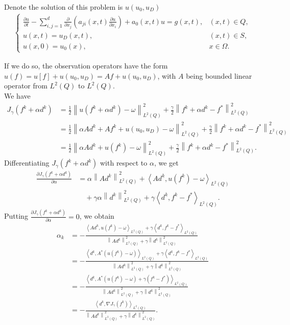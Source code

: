 \documentclass[]{article}
\begin{document}
\begin{bt}\label{bt2.2}
	Denote the solution of this problem is $u(u_0, u_D)$
	\begin{align*}
		\begin{cases}
			\frac{\partial u}{\partial t}-\sum_{i, j=1}^{d}\frac{\partial}{\partial x_j}\left(a_{ji}(x, t)\frac{\partial u}{\partial x_i}\right)+a_0(x, t)u=g(x, t),&(x, t)\in Q,\\
			u(x, t)=u_D(x, t), & (x, t)\in S,\\
			u(x, 0)=u_0(x),&x\in \Omega.
		\end{cases}
	\end{align*}
\end{bt}
\noindent If we do so, the observation operators have the form $u(f)= u[f]+ u(u_0, u_D)=Af+ u(u_0, u_D)$, with $A$ being bounded linear operator from $L^2(Q)$ to $L^2(Q)$.\\
We have
\begin{align*}
	J_{\gamma}(f^k+\alpha d^k)&=\frac{1}{2}\left\| u(f^k+\alpha d^k)-\omega\right\|_{L^2(Q)}^2+\frac{\gamma}{2}\left\|f^k+\alpha d^k-f^*\right\|_{L^2(Q)}^2\\[0.2cm]
	&=\frac{1}{2}\left\|\alpha Ad^k+Af^k+ u(u_0, u_D)-\omega\right\|_{L^2(Q)}^2+\frac{\gamma}{2}\left\|f^k+\alpha d^k-f^*\right\|_{L^2(Q)}^2\\[0.2cm]
	&=\frac{1}{2}\left\|\alpha Ad^k+ u(f^k)-\omega\right\|_{L^2(Q)}^2+\frac{\gamma}{2}\left\|f^k+\alpha d^k-f^*\right\|_{L^2(Q)}^2.
\end{align*}
Differentiating $J_\gamma(f^k+\alpha d^k)$ with respect to $\alpha$, we get
\begin{align*}
	\frac{\partial J_\gamma(f^k+\alpha d^k)}{\partial \alpha} &= \alpha\left\|Ad^k \right\|_{L^2(Q)}^2+\left\langle Ad^k, u(f^k)-\omega\right\rangle_{L^2(Q)}\\[0.2cm]
	&\quad+\gamma\alpha\left\| d^k\right\|_{L^2(Q)}^2+\gamma\left\langle d^k, f^k-f^*\right\rangle_{L^2(Q)}.
\end{align*}
Putting $\frac{\partial J_\gamma(f^k+\alpha d^k)}{\partial \alpha}=0$, we obtain
\begin{align*}
	\alpha_k&=-\frac{\displaystyle\left\langle Ad^k,  u(f^k)-\omega\right\rangle_{L^2(Q)}+\gamma\left\langle d^k, f^k-f^*\right\rangle_{L^2(Q)}}{\displaystyle\left\|Ad^k\right\|^2_{L^2(Q)}+\gamma\left\|d^k\right\|^2_{L^2(Q)}}\\[0.2cm]
	&=-\frac{\displaystyle\left\langle d^k, A^*\left( u(f^k)-\omega\right)\right\rangle_{L^2(Q)}+\gamma\left\langle d^k, f^k-f^*\right\rangle_{L^2(Q)}}{\displaystyle\left\|Ad^k\right\|^2_{L^2(Q)}+\gamma\left\|d^k\right\|^2_{L^2(Q)}}\\[0.2cm]
	&=-\frac{\displaystyle\left\langle d^k, A^*\left( u(f^k)-\omega\right)+\gamma(f^k-f^*)\right\rangle_{L^2(Q)}}{\displaystyle\left\|Ad^k\right\|^2_{L^2(Q)}+\gamma\left\|d^k\right\|^2_{L^2(Q)}}\\[0.2cm]
	&=-\frac{\left\langle d^k,\nabla J_\gamma(f^k)\right\rangle_{L^2(Q)}}{\displaystyle\left\|Ad^k\right\|^2_{L^2(Q)}+\gamma\left\|d^k\right\|^2_{L^2(Q)}}.
\end{align*}
\end{document}
